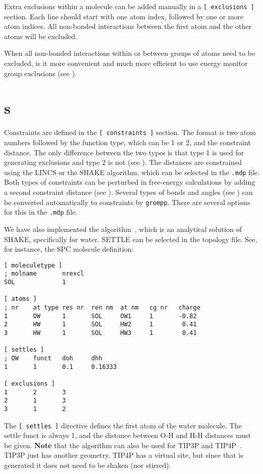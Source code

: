 Extra exclusions within a molecule can be added manually
in a {\tt [~exclusions~]} section. Each line should start with one
atom index, followed by one or more atom indices. All non-bonded
interactions between the first atom and the other atoms will be excluded.

When all non-bonded interactions within or between groups of atoms need
to be excluded, is it more convenient and much more efficient to use
energy monitor group exclusions (see ).

\section{s}
\label{sec:constraints}
Constraints are defined in the {\tt [~constraints~]} section.
The format is two atom numbers followed by the function type,
which can be 1 or 2, and the constraint distance.
The only difference between the two types is that type 1 is used
for generating exclusions and type 2 is not (see ).
The distances are constrained using the LINCS or the SHAKE algorithm,
which can be selected in the {\tt *.mdp} file.
Both types of constraints can be perturbed in free-energy calculations
by adding a second constraint distance (see ).
Several types of bonds and angles (see ) can
be converted automatically to constraints by {\tt grompp}.
There are several options for this in the {\tt *.mdp} file.

We have also implemented the  algorithm~\cite{Miyamoto92},
which is an analytical solution of SHAKE, specifically for water. 
SETTLE can be selected in the topology file. See, for instance, the
SPC molecule definition:

{\small
\begin{verbatim}
[ moleculetype ]
; molname       nrexcl
SOL             1

[ atoms ]
; nr    at type res nr  ren nm  at nm   cg nr   charge
1       OW      1       SOL     OW1     1       -0.82
2       HW      1       SOL     HW2     1        0.41
3       HW      1       SOL     HW3     1        0.41

[ settles ]
; OW    funct   doh     dhh
1       1       0.1     0.16333

[ exclusions ]
1       2       3
2       1       3
3       1       2
\end{verbatim}}

The {\tt [~settles~]} directive defines the first atom of the water molecule.
The settle funct is always 1, and the distance between O-H and H-H distances
must be given. {\bf Note} that the algorithm can also be used
for TIP3P and TIP4P~\cite{Jorgensen83}.
TIP3P just has another geometry. TIP4P has a virtual site, but since 
that is generated it does not need to be shaken (nor stirred).

